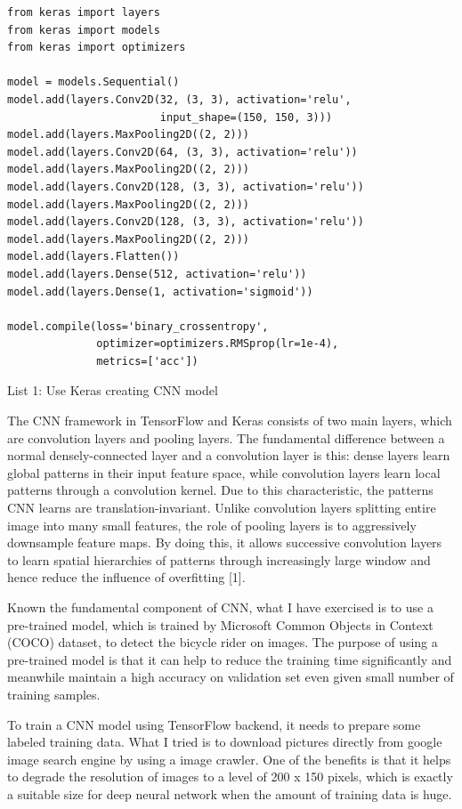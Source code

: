 \documentclass[titlepage]{article}
\begin{document}
\begin{listing}
\begin{verbatim}
from keras import layers
from keras import models
from keras import optimizers

model = models.Sequential()
model.add(layers.Conv2D(32, (3, 3), activation='relu',
                        input_shape=(150, 150, 3)))
model.add(layers.MaxPooling2D((2, 2)))
model.add(layers.Conv2D(64, (3, 3), activation='relu'))
model.add(layers.MaxPooling2D((2, 2)))
model.add(layers.Conv2D(128, (3, 3), activation='relu'))
model.add(layers.MaxPooling2D((2, 2)))
model.add(layers.Conv2D(128, (3, 3), activation='relu'))
model.add(layers.MaxPooling2D((2, 2)))
model.add(layers.Flatten())
model.add(layers.Dense(512, activation='relu'))
model.add(layers.Dense(1, activation='sigmoid'))

model.compile(loss='binary_crossentropy',
              optimizer=optimizers.RMSprop(lr=1e-4),
              metrics=['acc'])
\end{verbatim}
\centering
\caption{List 1: Use Keras creating CNN model}
\newline
\end{listing}

The CNN framework in TensorFlow and Keras consists of two main layers, which
are convolution layers and pooling layers. The fundamental difference between
a normal densely-connected layer and a convolution layer is this: dense
layers learn global patterns in their input feature space, while convolution
layers learn local patterns through a convolution kernel. Due to this
characteristic, the patterns CNN learns are translation-invariant. Unlike
convolution layers splitting entire image into many small features, the role
of pooling layers is to aggressively downsample feature maps. By doing this,
it allows successive convolution layers to learn spatial hierarchies of
patterns through increasingly large window and hence reduce the influence of
overfitting [1].

Known the fundamental component of CNN, what I have exercised is to use a
pre-trained model, which is trained by Microsoft Common Objects in Context
(COCO) dataset, to detect the bicycle rider on images. The purpose of using a
pre-trained model is that it can help to reduce the training time
significantly and meanwhile maintain a high accuracy on validation set even
given small number of training samples.

To train a CNN model using TensorFlow backend, it needs to prepare some
labeled training data. What I tried is to download pictures directly from
google image search engine by using a image crawler. One of the benefits is
that it helps to degrade the resolution of images to a level of 200 x 150
pixels, which is exactly a suitable size for deep neural network when the
amount of training data is huge.
\end{document}
